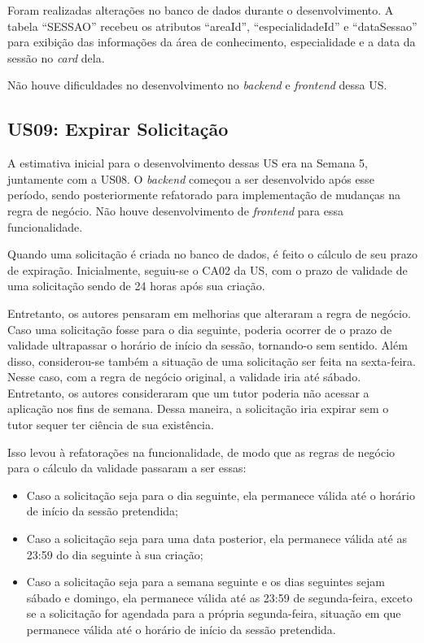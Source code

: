 Foram realizadas alterações no banco de dados durante o desenvolvimento. A tabela ``SESSAO'' recebeu os atributos ``areaId'', ``especialidadeId'' e ``dataSessao'' para exibição das informações da área de conhecimento, especialidade e a data da sessão no \textit{card} dela.

Não houve dificuldades no desenvolvimento no \textit{backend} e \textit{frontend} dessa US.

\subsection[US09: Expirar Solicitação]{US09: Expirar Solicitação}

A estimativa inicial para o desenvolvimento dessas US era na Semana 5, juntamente com a US08. O \textit{backend} começou a ser desenvolvido após esse período, sendo posteriormente refatorado para implementação de mudanças na regra de negócio. Não houve desenvolvimento de \textit{frontend} para essa funcionalidade.

Quando uma solicitação é criada no banco de dados, é feito o cálculo de seu prazo de expiração. Inicialmente, seguiu-se o CA02 da US, com o prazo de validade de uma solicitação sendo de 24 horas após sua criação.

Entretanto, os autores pensaram em melhorias que alteraram a regra de negócio. Caso uma solicitação fosse para o dia seguinte, poderia ocorrer de o prazo de validade ultrapassar o horário de início da sessão, tornando-o sem sentido. Além disso, considerou-se também a situação de uma solicitação ser feita na sexta-feira. Nesse caso, com a regra de negócio original, a validade iria até sábado. Entretanto, os autores consideraram que um tutor poderia não acessar a aplicação nos fins de semana. Dessa maneira, a solicitação iria expirar sem o tutor sequer ter ciência de sua existência.

Isso levou à refatorações na funcionalidade, de modo que as regras de negócio para o cálculo da validade passaram a ser essas:

\begin{itemize}

\item Caso a solicitação seja para o dia seguinte, ela permanece válida até o horário de início da sessão pretendida;

\item Caso a solicitação seja para uma data posterior, ela permanece válida até as 23:59 do dia seguinte à sua criação;

\item Caso a solicitação seja para a semana seguinte e os dias seguintes sejam sábado e domingo, ela permanece válida até as 23:59 de segunda-feira, exceto se a solicitação for agendada para a própria segunda-feira, situação em que permanece válida até o horário de início da sessão pretendida.

\end{itemize}

